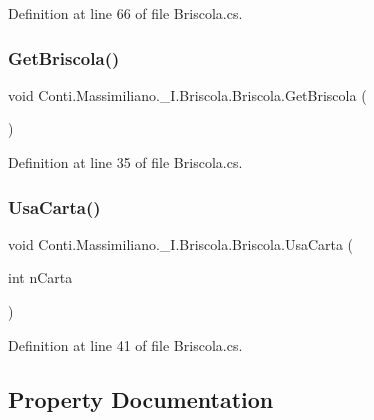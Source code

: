 Definition at line 66 of file Briscola.\+cs.

\hypertarget{class_conti_1_1_massimiliano_1_1__5_i_1_1_briscola_1_1_briscola_a4bdba07c9afe58bd18b169c801de4171}{}\label{class_conti_1_1_massimiliano_1_1__5_i_1_1_briscola_1_1_briscola_a4bdba07c9afe58bd18b169c801de4171} 
\subsubsection{\texorpdfstring{Get\+Briscola()}{GetBriscola()}}
{\footnotesize\ttfamily void Conti.\+Massimiliano.\+\_\+I.\+Briscola.\+Briscola.\+Get\+Briscola (\begin{DoxyParamCaption}{ }\end{DoxyParamCaption})}



Definition at line 35 of file Briscola.\+cs.

\hypertarget{class_conti_1_1_massimiliano_1_1__5_i_1_1_briscola_1_1_briscola_a78da2368c5afe82542e366c5a282b583}{}\label{class_conti_1_1_massimiliano_1_1__5_i_1_1_briscola_1_1_briscola_a78da2368c5afe82542e366c5a282b583} 
\subsubsection{\texorpdfstring{Usa\+Carta()}{UsaCarta()}}
{\footnotesize\ttfamily void Conti.\+Massimiliano.\+\_\+I.\+Briscola.\+Briscola.\+Usa\+Carta (\begin{DoxyParamCaption}\item[{int}]{n\+Carta }\end{DoxyParamCaption})}



Definition at line 41 of file Briscola.\+cs.



\subsection{Property Documentation}
\hypertarget{class_conti_1_1_massimiliano_1_1__5_i_1_1_briscola_1_1_briscola_a2339bcf37d438392eaba00abc55a9412}{}\label{class_conti_1_1_massimiliano_1_1__5_i_1_1_briscola_1_1_briscola_a2339bcf37d438392eaba00abc55a9412} 
